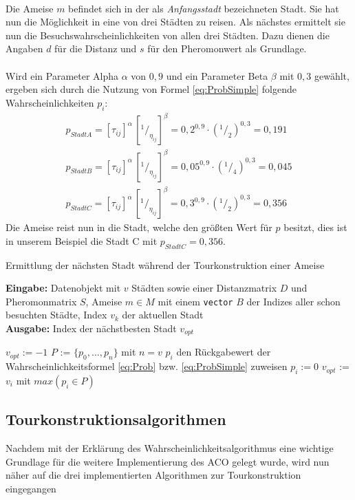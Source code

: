 \documentclass[doktyp=barbeit, sprache=german]{TUBAFarbeiten}
\newcommand*\rfrac[2]{{}^{#1}\!/_{#2}}
\begin{document}
\\Die Ameise $m$ befindet sich in der als \textit{Anfangsstadt} bezeichneten Stadt. Sie hat nun die Möglichkeit in eine von drei Städten zu reisen. Als nächstes ermittelt sie nun die Besuchswahrscheinlichkeiten von allen drei Städten. Dazu dienen die Angaben $d$ für die Distanz und $s$ für den Pheromonwert als Grundlage. \\\\Wird ein Parameter Alpha $\alpha$ von $0,9$ und ein Parameter Beta $\beta$ mit $0,3$ gewählt, ergeben sich durch die Nutzung von Formel \ref{eq:ProbSimple} folgende Wahrscheinlichkeiten $p_i$:
\begin{align}
\label{examplePheromone}
p_{Stadt A} = [\tau_{ij}]^\alpha \, [\rfrac{1}{\eta_{ij}}]^\beta = 0,2^{0,9} \cdot (\rfrac{1}{2})^{0,3} = 0,191 \nonumber
\\p_{Stadt B} = [\tau_{ij}]^\alpha \, [\rfrac{1}{\eta_{ij}}]^\beta = 0,05^{0,9} \cdot (\rfrac{1}{4})^{0,3} = 0,045 \nonumber
\\p_{Stadt C} = [\tau_{ij}]^\alpha \, [\rfrac{1}{\eta_{ij}}]^\beta = 0,3^{0,9} \cdot (\rfrac{1}{2})^{0,3} = 0,356 \nonumber
\end{align}
Die Ameise reist nun in die Stadt, welche den größten Wert für $p$ besitzt, dies ist in unserem Beispiel die Stadt C mit $p_{Stadt C} = 0,356$.
\begin{algorithm}
\caption{Ermittlung der nächsten Stadt während der Tourkonstruktion einer Ameise}
\label{probabilityAlg}
\textbf{Eingabe:} Datenobjekt mit $v$ Städten sowie einer Distanzmatrix $D$ und Pheromonmatrix $S$, Ameise $m \in M$ mit einem \texttt{vector} $B$ der Indizes aller schon besuchten Städte, Index $v_k$ der aktuellen Stadt
\\\textbf{Ausgabe:} Index der nächstbesten Stadt $v_{opt}$
\begin{algorithmic}[1]
\State $v_{opt} := -1$
\State $P$ := $\{p_0, ..., p_n\}$ mit $n = v$ 
\State $p_i$ den Rückgabewert der Wahrscheinlichkeitsformel \ref{eq:Prob} bzw. \ref{eq:ProbSimple} zuweisen
\Else 
\State $p_i := 0$
\EndIf
\EndFor
\State $v_{opt}$ := $v_i$ mit $max(p_i \in P)$
\end{algorithmic}
\end{algorithm}
\subsection{Tourkonstruktionsalgorithmen}
\label{sec:Tourkonstruktionsalgorithmen}
Nachdem mit der Erklärung des Wahrscheinlichkeitsalgorithmus eine wichtige Grundlage für die weitere Implementierung des ACO gelegt wurde, wird nun näher auf die drei implementierten Algorithmen zur Tourkonstruktion eingegangen
\end{document}
